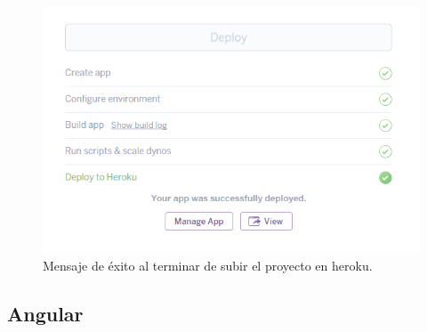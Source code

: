 \begin{figure}[!h]
	\centering
	\includegraphics[width=0.7\linewidth]{images/tecnologias/heroku6.PNG}
	\caption{Mensaje de éxito al terminar de subir el proyecto en heroku.}
\end{figure}

\subsection{Angular}
